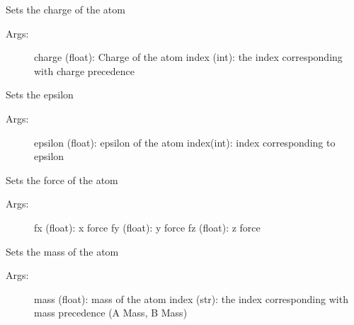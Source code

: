 \documentclass[letterpaper,10pt,english]{sphinxmanual}
\begin{document}
\begin{fulllineitems}
\begin{fulllineitems}
\begin{description}
\end{description}

\end{fulllineitems}



\begin{fulllineitems}
\label{atom:ctools.Atom.Atom.setCharge}
Sets the charge of the atom
\begin{description}
\item[{Args:}] \leavevmode
charge (float): Charge of the atom
index (int): the index corresponding with charge precedence

\end{description}

\end{fulllineitems}



\begin{fulllineitems}
\label{atom:ctools.Atom.Atom.setEpsilon}
Sets the epsilon
\begin{description}
\item[{Args:}] \leavevmode
epsilon (float): epsilon of the atom
index(int): index corresponding to epsilon

\end{description}

\end{fulllineitems}



\begin{fulllineitems}
\label{atom:ctools.Atom.Atom.setForce}
Sets the force of the atom
\begin{description}
\item[{Args:}] \leavevmode
fx (float): x force
fy (float): y force
fz (float): z force

\end{description}

\end{fulllineitems}



\begin{fulllineitems}
\label{atom:ctools.Atom.Atom.setMass}
Sets the mass of the atom
\begin{description}
\item[{Args:}] \leavevmode
mass (float): mass of the atom
index (str): the index corresponding with mass precedence (A Mass, B Mass)


\end{description}
\end{fulllineitems}
\end{fulllineitems}
\end{document}
